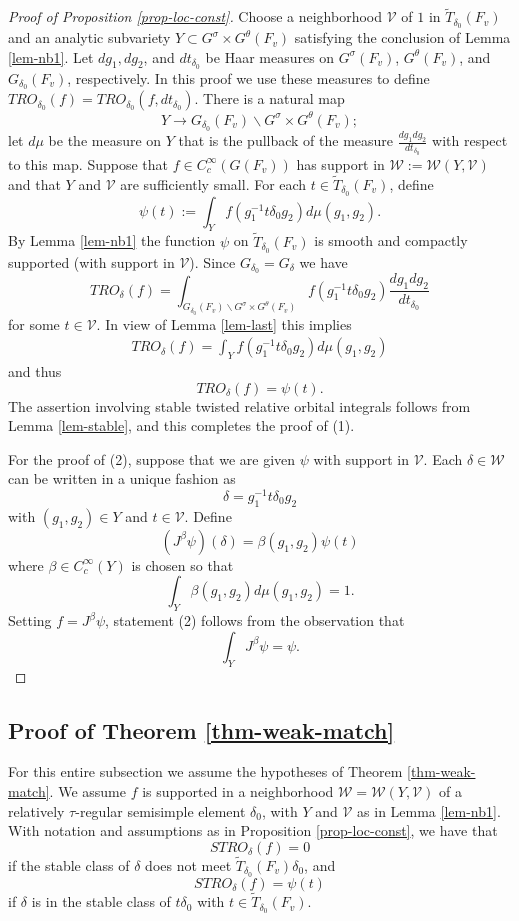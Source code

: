 \documentclass[12pt]{amsart}
\theoremstyle{remark}
\numberwithin{equation}{section}
\newcommand{\lto}{\longrightarrow}
\theoremstyle{definition}
\numberwithin{equation}{subsection}
\begin{document}
\begin{proof}[Proof of Proposition \ref{prop-loc-const}]
Choose a neighborhood $\mathcal{V}$ of $1$ in $\widetilde{T}_{\delta_0}(F_v)$ and an analytic subvariety $Y \subset G^{\sigma} \times G^{\theta}(F_v)$ satisfying the conclusion of Lemma \ref{lem-nb1}.
Let $dg_1,dg_2$, and $dt_{\delta_0}$ be Haar measures on $G^{\sigma}(F_v)$, $G^{\theta}(F_v)$, and $G_{\delta_0}(F_v)$, respectively.  In this proof we use these measures to define $TRO_{\delta_0}(f)=TRO_{\delta_0}(f,dt_{\delta_0})$.  There is a natural map
$$
Y \lto G_{\delta_0}(F_v) \backslash G^{\sigma} \times G^{\theta}(F_v);
$$
let $d\mu$ be the measure on $Y$ that is the pullback of the measure $\frac{dg_1 dg_{2}}{dt_{\delta_0}}$ with respect to this map.  Suppose that $f \in C_c^{\infty}(G(F_v))$ has support in $\mathcal{W}:=\mathcal{W}(Y,\mathcal{V})$ and that $Y$ and $\mathcal{V}$ are sufficiently small.  For each $t \in \widetilde{T}_{\delta_0}(F_v)$, define
$$
\psi(t):=\int_Y f(g_1^{-1}t\delta_0 g_2)d\mu(g_1,g_2).
$$
By Lemma \ref{lem-nb1} the function $\psi$ on $\widetilde{T}_{\delta_0}(F_v)$ is smooth and compactly supported (with support in $\mathcal{V}$).  Since
$
G_{\delta_0}=G_{\delta}
$
we have
$$
TRO_{\delta}(f)=\int_{G_{\delta_0}(F_v) \backslash G^{\sigma}\times G^{\theta}(F_v)}  f(g_1^{-1}t\delta_0 g_2)  \frac{dg_1 dg_2}{dt_{\delta_0}}
$$
for some $t \in \mathcal{V}$.  In view of Lemma \ref{lem-last} this implies
\begin{align*}
TRO_{\delta}(f)=\int_{Y}  f(g_1^{-1}t \delta_0 g_2)  d\mu(g_1,g_2)
\end{align*}
and thus
$$
TRO_{\delta}(f)= \psi(t).
$$
The assertion involving stable twisted relative orbital integrals follows from Lemma
\ref{lem-stable}, and this completes the proof of (1).

For the proof of (2), suppose that we are given $\psi$ with support in $\mathcal{V}$.  Each $\delta \in \mathcal{W}$ can be written in a unique fashion as
$$
\delta=g_1^{-1}t \delta_0g_2
$$
with $(g_1,g_2) \in Y$ and $t \in \mathcal{V}$.  Define
$$
(J^{\beta}\psi)(\delta)=\beta(g_1,g_2) \psi(t)
$$
where $\beta \in C_c^{\infty}(Y)$ is chosen so that
$$
\int_Y \beta(g_1,g_2)d\mu(g_1,g_2)=1.
$$
Setting $f=J^{\beta}\psi$, statement (2) follows from the observation that
$$
\int_Y J^{\beta}\psi=\psi.
$$

\end{proof}


\subsection{Proof of Theorem \ref{thm-weak-match}}
For this entire subsection we assume the hypotheses of Theorem \ref{thm-weak-match}.  We assume $f$ is supported in a neighborhood $\mathcal{W}=\mathcal{W}(Y,\mathcal{V})$ of a
relatively $\tau$-regular semisimple element $\delta_0$, with $Y$ and $\mathcal{V}$  as in Lemma \ref{lem-nb1}.  With notation and assumptions as in Proposition \ref{prop-loc-const}, we have that
$$
STRO_{\delta}(f)=0
$$
if the stable class of $\delta$ does not meet $\widetilde{T}_{\delta_0}(F_v)\delta_0$, and
$$
STRO_{\delta}(f)=\psi(t)
$$
if $\delta$ is in the stable class of $t\delta_0$ with $t \in \widetilde{T}_{\delta_0}(F_v)$.
\end{document}
